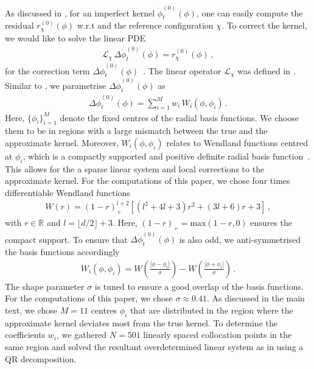 \documentclass[reprint,amsmath,amssymb,aps,pra,superscriptaddress,nofootinbib,twocolumn,floatfix,nolongbibliography]{revtex4-2}
\begin{document}
As discussed in , for an imperfect kernel $\dot{\phi}^{(0)}_t(\phi)$, one can easily compute the residual $r^{(0)}_\chi(\phi)$ w.r.t  and the reference configuration $\chi$. To correct the kernel, we would like to solve the linear PDE
%
\begin{align}
    \mathcal{L}_\chi \, \Delta \dot{\phi}^{(0)}_t(\phi) = r^{(0)}_\chi(\phi)\,,
\end{align}
%
for the correction term $\Delta \dot{\phi}^{(0)}_t(\phi)$~\cite{DeVore:1996gag}. The linear operator $\mathcal{L}_\chi$ was defined in . Similar to , we parametrise $\Delta \dot{\phi}^{(0)}_t(\phi)$ as 
%
\begin{align}
    \Delta \dot{\phi}^{(0)}_t(\phi) = \sum_{i=1}^{M} w_i \, W_i(\phi, \phi_i)\,.
\end{align}
%
Here, $\{\phi_i\}_{i=1}^M$ denote the fixed centres of the radial basis functions. We choose them to be in regions with a large mismatch between the true and the approximate kernel. Moreover, $W_i(\phi, \phi_i)$ relates to Wendland functions centred at $\phi_i$, which is a compactly supported and positive definite radial basis function~\cite{Wendland:1995ppp}. This allows for the a sparse linear system and local corrections to the approximate kernel. For the computations of this paper, we chose four times differentiable Wendland functions
%
\begin{align}
    W(r) = 
    (1-r)_+^{l+2} \left[ (l^2 + 4l +3) r^2 + (3l + 6) r + 3 \right]\,, 
\end{align}
%
with $r \in \mathds{R}$ and $l = \lfloor d/2 \rfloor +3$. Here, $(1-r)_+ = \textrm{max}(1-r,0)$ ensures the compact support. To ensure that $\Delta \dot{\phi}^{(0)}_t(\phi)$ is also odd, we anti-symmetrised the basis functions accordingly
%
\begin{align}
    W_i(\phi, \phi_i) = W\left(\frac{|\phi - \phi_i|}{\sigma}\right) - W\left(\frac{|\phi + \phi_i|}{\sigma}\right)\,.
\end{align}
%
The shape parameter $\sigma$ is tuned to ensure a good overlap of the basis functions. For the computations of this paper, we chose $\sigma \approx 0.41$. As discussed in the main text, we chose $M=11$ centres $\phi_i$ that are distributed in the region where the approximate kernel deviates most from the true kernel. To determine the coefficients $w_i$, we gathered $N=501$ linearly spaced collocation points in the same region and solved the resultant overdetermined linear system as in  using a QR decomposition.
\end{document}
